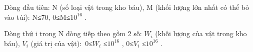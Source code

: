 Dòng đầu tiên: N (số loại vật trong kho báu), M (khối lượng lớn nhất có thể bỏ vào túi): N≤70, 0≤M≤$10^{16}$ .

Dòng thứ i trong N dòng tiếp theo gồm 2 số: $W_{i}$ (khối lượng của vật trong kho báu), $V_{i}$ (giá trị của vật): 0≤$W_{i}$ ≤$10^{16}$ , 0≤$V_{i}$ ≤$10^{16}$ .
